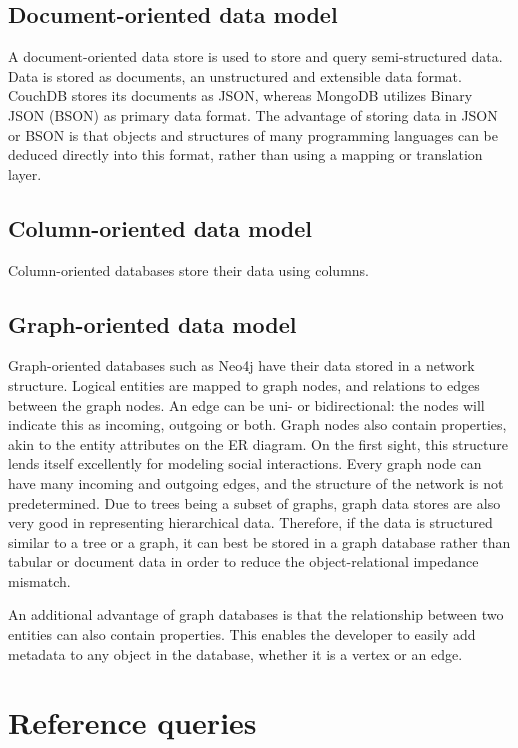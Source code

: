 \subsection{Document-oriented data model}
\label{sec:document-data-model}

A document-oriented data store is used to store and query semi-structured data.
Data is stored as documents, an unstructured and extensible data format.
CouchDB stores its documents as JSON, whereas MongoDB utilizes Binary JSON (BSON) as primary data format.
The advantage of storing data in JSON or BSON is that objects and structures of many programming languages can be deduced directly into this format, rather than using a mapping or translation layer.

\subsection{Column-oriented data model}
\label{sec:column-data-model}

Column-oriented databases store their data using columns.

\subsection{Graph-oriented data model}
\label{sec:graph-data-model}

Graph-oriented databases such as Neo4j have their data stored in a network structure.
Logical entities are mapped to graph nodes, and relations to edges between the graph nodes.
An edge can be uni- or bidirectional: the nodes will indicate this as incoming, outgoing or both.
Graph nodes also contain properties, akin to the entity attributes on the ER diagram.
On the first sight, this structure lends itself excellently for modeling social interactions.
Every graph node can have many incoming and outgoing edges, and the structure of the network is not predetermined.
Due to trees being a subset of graphs, graph data stores are also very good in representing hierarchical data.
Therefore, if the data is structured similar to a tree or a graph, it can best be stored in a graph database rather than tabular or document data in order to reduce the object-relational impedance mismatch.

An additional advantage of graph databases is that the relationship between two entities can also contain properties.
This enables the developer to easily add metadata to any object in the database, whether it is a vertex or an edge.

\section{Reference queries}
\label{sec:reference-queries}

